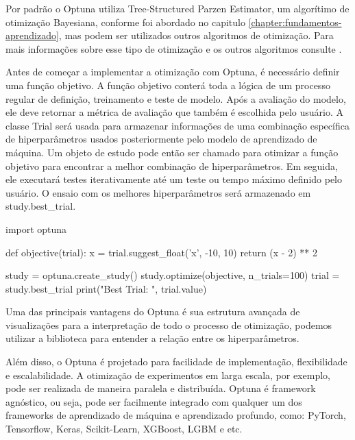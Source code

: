 Por padrão o Optuna utiliza Tree-Structured Parzen Estimator, um algorítimo de otimização Bayesiana, conforme foi abordado no capitulo \ref{chapter:fundamentos-aprendizado}, mas podem ser utilizados outros algoritmos de otimização. Para mais informações sobre esse tipo de otimização e os outros algoritmos consulte \cite{doc:optuna,hyper:op:theory,grid:book,neural:op,op:TPE}.

Antes de começar a implementar a otimização com Optuna, é necessário definir uma função objetivo. A função objetivo conterá toda a lógica de um processo regular de definição, treinamento e teste de modelo. Após a avaliação do modelo, ele deve retornar a métrica de avaliação que também é escolhida pelo usuário.
A classe Trial será usada para armazenar informações de uma combinação específica de hiperparâmetros usados posteriormente pelo modelo de aprendizado de máquina.
Um objeto de estudo pode então ser chamado para otimizar a função objetivo para encontrar a melhor combinação de hiperparâmetros. Em seguida, ele executará testes iterativamente até um teste ou tempo máximo definido pelo usuário. O ensaio com os melhores hiperparâmetros será armazenado em study.best\_trial.

\begin{codigo}[caption={Definição de uma função objetivo e o processo de otimização no Optuna}, label={codigo:ex:optuna}, language=Python, breaklines=true]
import optuna

def objective(trial):
    x = trial.suggest_float('x', -10, 10)
    return (x - 2) ** 2

study = optuna.create_study()
study.optimize(objective, n_trials=100)
trial = study.best_trial
print("Best Trial: ", trial.value)
\end{codigo}

Uma das principais vantagens do Optuna é sua estrutura avançada de visualizações para a interpretação de todo o processo de otimização, podemos utilizar a biblioteca para entender a relação entre os hiperparâmetros.

Além disso, o Optuna é projetado para facilidade de implementação, flexibilidade e escalabilidade. A otimização de experimentos em larga escala, por exemplo, pode ser realizada de maneira paralela e distribuída. Optuna é framework agnóstico, ou seja, pode ser facilmente integrado com qualquer um dos frameworks de aprendizado de máquina e aprendizado profundo, como: PyTorch, Tensorflow, Keras, Scikit-Learn, XGBoost, LGBM e etc.

